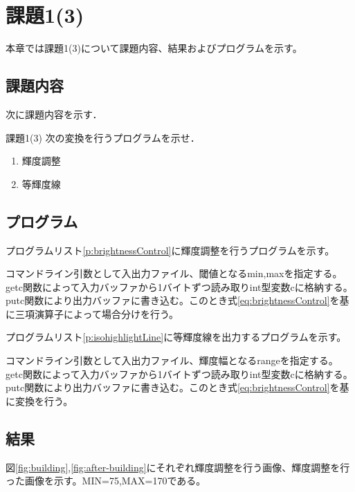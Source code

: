\documentclass[11pt,a4paper,titlepage,dvipdfmx]{jarticle}
\begin{document}
  \section{課題1(3)}
  本章では課題1(3)について課題内容、結果およびプログラムを示す。
  \subsection{課題内容}
    次に課題内容を示す．
    \begin{itembox}[l]{課題1(3)}
      次の変換を行うプログラムを示せ．
      \begin{enumerate}
        \item 輝度調整
        \item 等輝度線
      \end{enumerate}
    \end{itembox}
  \subsection{プログラム}
    プログラムリスト\ref{p:brightnessControl}に輝度調整を行うプログラムを示す。
    

    コマンドライン引数として入出力ファイル、閾値となるmin,maxを指定する。getc関数によって入力バッファから1バイトずつ読み取りint型変数cに格納する。
    putc関数により出力バッファに書き込む。このとき式\eqref{eq:brightnessControl}を基に三項演算子によって場合分けを行う。

    プログラムリスト\ref{p:isohighlightLine}に等輝度線を出力するプログラムを示す。
    

    コマンドライン引数として入出力ファイル、輝度幅となるrangeを指定する。getc関数によって入力バッファから1バイトずつ読み取りint型変数cに格納する。
    putc関数により出力バッファに書き込む。このとき式\eqref{eq:brightnessControl}を基に変換を行う。

  \subsection{結果}
    図\ref{fig:building},\ref{fig:after-building}にそれぞれ輝度調整を行う画像、輝度調整を行った画像を示す。MIN=75,MAX=170である。
\end{document}
